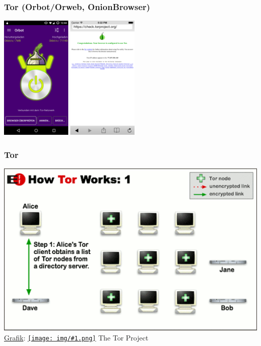 \documentclass[12pt, xcolor={svgnames,table}]{beamer}
\newcommand{\cc}[1]{\texttt{[image: img/\#1.png]}\hspace{1mm}}
\begin{document}
\begin{frame}
  \frametitle{Tor (Orbot/Orweb, OnionBrowser)}
    \begin{center}
      \includegraphics[height=6cm]{img/orbot.png}
      \hspace{0.5cm}
      \includegraphics[height=6cm]{img/onionbrowser.png}
    \end{center}
\end{frame}

\begin{frame}
    \frametitle{Tor}
    \includegraphics[height=0.7\textheight]{img/tor1.png}
    \\{\small \href{https://www.torproject.org/images/htw1.png}{Grafik}: \href{https://creativecommons.org/licenses/by/3.0/us/}{\cc{by}} The Tor Project}
\end{frame}
\end{document}
